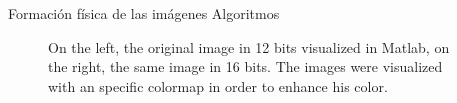 Formación física de las imágenes
Algoritmos

\begin{figure}[h!]
  \begin{center}
    \hspace{\fill}
    \hfill
    \hspace{\fill}

  \caption[Comparison between 12 and 16 bits images]{On the left, the original
  image in 12 bits visualized in Matlab, on the right, the same image in 16
  bits. The images were visualized with an specific colormap in order to
  enhance his color.} 

  \end{center}
  \label{bitconversionimage} 
\end{figure}



